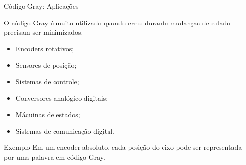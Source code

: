 \begin{frame}{Código Gray: Aplicações}
    \small

    O código Gray é muito utilizado quando erros durante
    mudanças de estado precisam ser minimizados.

    \begin{itemize}
        \item Encoders rotativos;
        \item Sensores de posição;
        \item Sistemas de controle;
        \item Conversores analógico-digitais;
        \item Máquinas de estados;
        \item Sistemas de comunicação digital.
    \end{itemize}

    \vspace{0.3cm}

    \begin{block}{Exemplo}
        Em um encoder absoluto, cada posição do eixo pode ser
        representada por uma palavra em código Gray.
    \end{block}

\end{frame}
